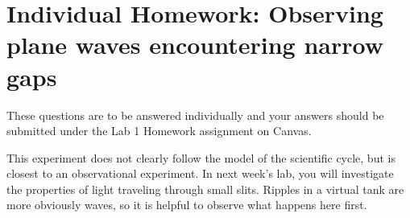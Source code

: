 %	
%	
%	
%
%
%	

\section{Individual Homework: Observing plane waves encountering narrow gaps}

These questions are to be answered individually and your answers should be submitted under the Lab 1 Homework assignment on Canvas.

This experiment does not clearly follow the model of the scientific cycle, but is closest to an observational experiment. In next week's lab, you will investigate the properties of light traveling through small slits. Ripples in a virtual tank are more obviously waves, so it is helpful to observe what happens here first.

